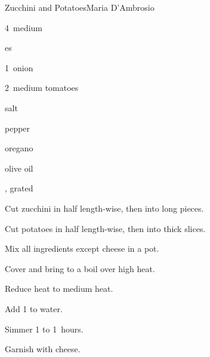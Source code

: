 \begin{recipe}{Zucchini and Potatoes}{Maria D'Ambrosio}{}

\begin{ingredients}
\item 4~medium 
\item {}es
\item 1~onion
\item 2~medium tomatoes
\item salt
\item pepper
\item oregano
\item olive oil
\item {}, grated
\end{ingredients}

\begin{directions}
\item Cut zucchini in half length-wise, then into  long pieces.
\item Cut potatoes in half length-wise, then into \inch{\half} thick slices.
\item Mix all ingredients except cheese in a pot.
\item Cover and bring to a boil over high heat.
\item Reduce heat to medium heat.
\item Add 1 to  water.
\item Simmer 1 to 1\half~hours.
\item Garnish with cheese.
\end{directions}

\end{recipe}
